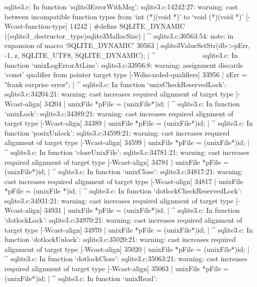 {{{sqlite3.c: In function ‘sqlite3ErrorWithMsg’:
sqlite3.c:14242:27: warning: cast between incompatible function types from ‘int (*)(void *)’ to ‘void (*)(void *)’ [-Wcast-function-type]
14242 | #define SQLITE_DYNAMIC   ((sqlite3_destructor_type)sqlite3MallocSize)
      |                           ^
sqlite3.c:30563:54: note: in expansion of macro ‘SQLITE_DYNAMIC’
30563 |     sqlite3ValueSetStr(db->pErr, -1, z, SQLITE_UTF8, SQLITE_DYNAMIC);
      |                                                      ^~~~~~~~~~~~~~
sqlite3.c: In function ‘unixLogErrorAtLine’:
sqlite3.c:33956:8: warning: assignment discards ‘const’ qualifier from pointer target type [-Wdiscarded-qualifiers]
33956 |   zErr = "frank surprise error";
      |        ^
sqlite3.c: In function ‘unixCheckReservedLock’:
sqlite3.c:34204:21: warning: cast increases required alignment of target type [-Wcast-align]
34204 |   unixFile *pFile = (unixFile*)id;
      |                     ^
sqlite3.c: In function ‘unixLock’:
sqlite3.c:34389:21: warning: cast increases required alignment of target type [-Wcast-align]
34389 |   unixFile *pFile = (unixFile*)id;
      |                     ^
sqlite3.c: In function ‘posixUnlock’:
sqlite3.c:34599:21: warning: cast increases required alignment of target type [-Wcast-align]
34599 |   unixFile *pFile = (unixFile*)id;
      |                     ^
sqlite3.c: In function ‘closeUnixFile’:
sqlite3.c:34781:21: warning: cast increases required alignment of target type [-Wcast-align]
34781 |   unixFile *pFile = (unixFile*)id;
      |                     ^
sqlite3.c: In function ‘unixClose’:
sqlite3.c:34817:21: warning: cast increases required alignment of target type [-Wcast-align]
34817 |   unixFile *pFile = (unixFile *)id;
      |                     ^
sqlite3.c: In function ‘dotlockCheckReservedLock’:
sqlite3.c:34931:21: warning: cast increases required alignment of target type [-Wcast-align]
34931 |   unixFile *pFile = (unixFile*)id;
      |                     ^
sqlite3.c: In function ‘dotlockLock’:
sqlite3.c:34970:21: warning: cast increases required alignment of target type [-Wcast-align]
34970 |   unixFile *pFile = (unixFile*)id;
      |                     ^
sqlite3.c: In function ‘dotlockUnlock’:
sqlite3.c:35020:21: warning: cast increases required alignment of target type [-Wcast-align]
35020 |   unixFile *pFile = (unixFile*)id;
      |                     ^
sqlite3.c: In function ‘dotlockClose’:
sqlite3.c:35063:21: warning: cast increases required alignment of target type [-Wcast-align]
35063 |   unixFile *pFile = (unixFile*)id;
      |                     ^
sqlite3.c: In function ‘unixRead’:
}}}
